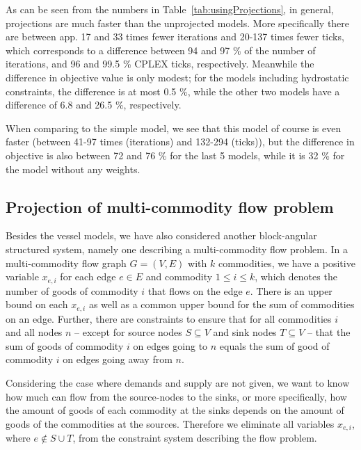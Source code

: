 As can be seen from the numbers in Table~\ref{tab:usingProjections}, in general, projections are much faster than the unprojected models. More specifically there are between app. 17 and 33 times fewer iterations and 20-137 times fewer ticks, which corresponds to a difference between 94 and 97 \% of the number of iterations, and 96 and 99.5 \% CPLEX ticks, respectively. 
Meanwhile the difference in objective value is only modest; for the models including hydrostatic constraints, the difference is at most 0.5 \%, while the other two models have a difference of 6.8 and 26.5 \%, respectively. 



When comparing to the simple model, we see that this model of course is even faster (between 41-97 times (iterations) and 132-294 (ticks)), but the difference in objective is also between 72 and 76 \% for the last 5 models, while it is 32 \% for the model without any weights. 

\subsection{Projection of multi-commodity flow problem}
Besides the vessel models, we have also considered another block-angular structured system, namely one describing a multi-commodity flow problem. In a multi-commodity flow graph $G=(V,E)$ with $k$ commodities, we have a positive variable $x_{e,i}$ for each edge $e\in E$ and commodity $1\leq i\leq k$, which denotes the number of goods of commodity $i$ that flows on the edge $e$. There is an upper bound on each $x_{e,i}$ as well as a common upper bound for the sum of commodities on an edge. Further, there are constraints to ensure that for all commodities $i$ and all nodes $n$ -- except for source nodes $S\subseteq V$ and sink nodes $T\subseteq V$ -- that the sum of goods of commodity $i$ on edges going to $n$ equals the sum of good of commodity $i$ on edges going away from $n$.

Considering the case where demands and supply are not given, we want to know how much can flow from the source-nodes to the sinks, or more specifically, how the amount of goods of each commodity at the sinks depends on the amount of goods of the commodities at the sources. Therefore we eliminate all variables $x_{e,i}$, where $e\notin S\cup T$, from the constraint system describing the flow problem.
		
